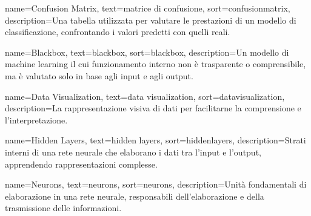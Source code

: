  {
    name={Confusion Matrix},
    text={matrice di confusione},
    sort={confusionmatrix},
    description={Una tabella utilizzata per valutare le prestazioni di un modello di classificazione, confrontando i valori predetti con quelli reali.}
}

 {
    name={Blackbox},
    text={blackbox},
    sort={blackbox},
    description={Un modello di machine learning il cui funzionamento interno non è trasparente o comprensibile, ma è valutato solo in base agli input e agli output.}
}

 {
    name={Data Visualization},
    text={data visualization},
    sort={datavisualization},
    description={La rappresentazione visiva di dati per facilitarne la comprensione e l'interpretazione.}
}

 {
    name={Hidden Layers},
    text={hidden layers},
    sort={hiddenlayers},
    description={Strati interni di una rete neurale che elaborano i dati tra l'input e l'output, apprendendo rappresentazioni complesse.}
}

 {
    name={Neurons},
    text={neurons},
    sort={neurons},
    description={Unità fondamentali di elaborazione in una rete neurale, responsabili dell'elaborazione e della trasmissione delle informazioni.}
}
